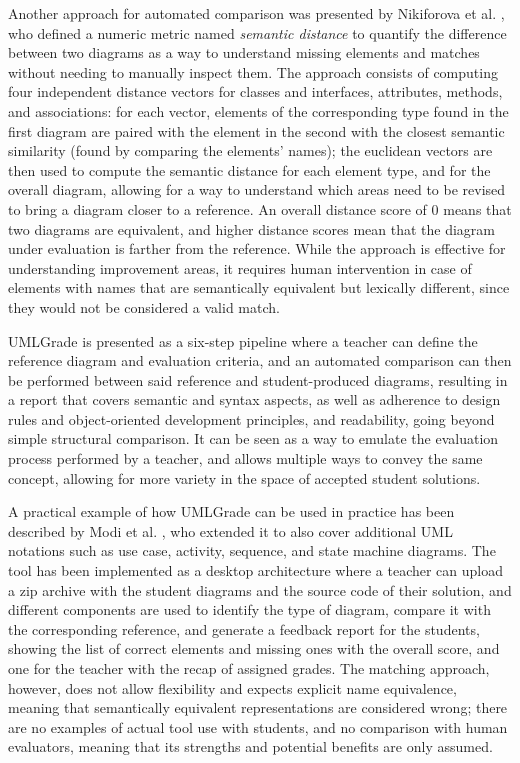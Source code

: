 Another approach for automated comparison was presented by Nikiforova et al. \cite{nikiforova2015approach}, who defined a numeric metric named \textit{semantic distance} to quantify the difference between two diagrams as a way to understand missing elements and matches without needing to manually inspect them. The approach consists of computing four independent distance vectors for classes and interfaces, attributes, methods, and associations: for each vector, elements of the corresponding type found in the first diagram are paired with the element in the second with the closest semantic similarity (found by comparing the elements' names); the euclidean vectors are then used to compute the semantic distance for each element type, and for the overall diagram, allowing for a way to understand which areas need to be revised to bring a diagram closer to a reference. An overall distance score of 0 means that two diagrams are equivalent, and higher distance scores mean that the diagram under evaluation is farther from the reference. While the approach is effective for understanding improvement areas, it requires human intervention in case of elements with names that are semantically equivalent but lexically different, since they would not be considered a valid match. 

UMLGrade \cite{farias2020whats} is presented as a six-step pipeline where a teacher can define the reference diagram and evaluation criteria, and an automated comparison can then be performed between said reference and student-produced diagrams, resulting in a report that covers semantic and syntax aspects, as well as adherence to design rules and object-oriented development principles, and readability, going beyond simple structural comparison. It can be seen as a way to emulate the evaluation process performed by a teacher, and allows multiple ways to convey the same concept, allowing for more variety in the space of accepted student solutions. 

A practical example of how UMLGrade can be used in practice has been described by Modi et al. \cite{modi2021tool}, who extended it to also cover additional UML notations such as use case, activity, sequence, and state machine diagrams. The tool has been implemented as a desktop architecture where a teacher can upload a zip archive with the student diagrams and the source code of their solution, and different components are used to identify the type of diagram, compare it with the corresponding reference, and generate a feedback report for the students, showing the list of correct elements and missing ones with the overall score, and one for the teacher with the recap of assigned grades. The matching approach, however, does not allow flexibility and expects explicit name equivalence, meaning that semantically equivalent representations are considered wrong; there are no examples of actual tool use with students, and no comparison with human evaluators, meaning that its strengths and potential benefits are only assumed. 

